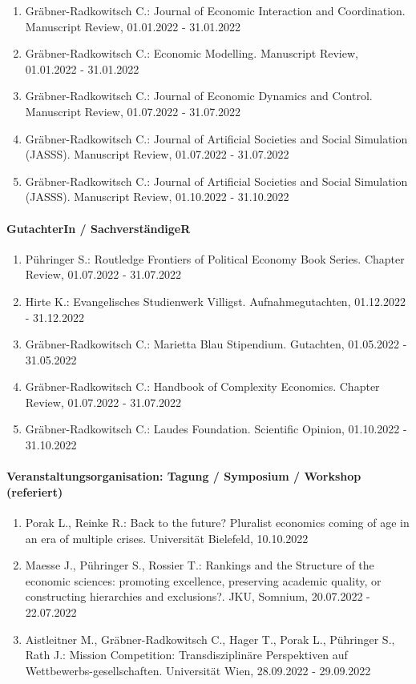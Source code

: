 \begin{enumerate}[leftmargin=*, labelsep=0.5cm]
	 \item Gräbner-Radkowitsch C.: Journal of Economic Interaction and Coordination. Manuscript Review, 01.01.2022 - 31.01.2022 
	 \item Gräbner-Radkowitsch C.: Economic Modelling. Manuscript Review, 01.01.2022 - 31.01.2022 
	 \item Gräbner-Radkowitsch C.: Journal of Economic Dynamics and Control. Manuscript Review, 01.07.2022 - 31.07.2022 
	 \item Gräbner-Radkowitsch C.: Journal of Artificial Societies and Social Simulation (JASSS). Manuscript Review, 01.07.2022 - 31.07.2022 
	 \item Gräbner-Radkowitsch C.: Journal of Artificial Societies and Social Simulation (JASSS). Manuscript Review, 01.10.2022 - 31.10.2022 
\end{enumerate} 
\paragraph{GutachterIn / SachverständigeR} 
\begin{enumerate}[leftmargin=*, labelsep=0.5cm] 
 	 \item Pühringer S.: Routledge Frontiers of Political Economy Book Series. Chapter Review, 01.07.2022 - 31.07.2022 
	 \item Hirte K.: Evangelisches Studienwerk Villigst. Aufnahmegutachten, 01.12.2022 - 31.12.2022 
	 \item Gräbner-Radkowitsch C.: Marietta Blau Stipendium. Gutachten, 01.05.2022 - 31.05.2022 
	 \item Gräbner-Radkowitsch C.: Handbook of Complexity Economics. Chapter Review, 01.07.2022 - 31.07.2022 
	 \item Gräbner-Radkowitsch C.: Laudes Foundation. Scientific Opinion, 01.10.2022 - 31.10.2022 
\end{enumerate} 
\paragraph{Veranstaltungsorganisation: Tagung / Symposium / Workshop (referiert)} 
\begin{enumerate}[leftmargin=*, labelsep=0.5cm] 
 	 \item Porak L., Reinke R.: Back to the future? Pluralist economics coming of age in an era of multiple crises. Universität Bielefeld, 10.10.2022 
	 \item Maesse J., Pühringer S., Rossier T.: Rankings and the Structure of the economic sciences: promoting excellence, preserving academic quality, or constructing hierarchies and exclusions?. JKU, Somnium, 20.07.2022 - 22.07.2022 
	 \item Aistleitner M., Gräbner-Radkowitsch C., Hager T., Porak L., Pühringer S., Rath J.: Mission Competition: Transdisziplinäre Perspektiven auf Wettbewerbs-gesellschaften. Universität Wien, 28.09.2022 - 29.09.2022 
\end{enumerate} 
